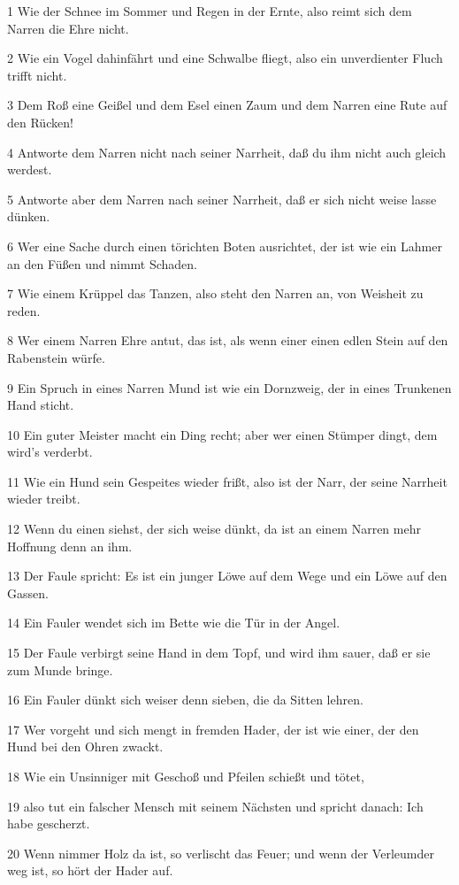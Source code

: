 \par 1 Wie der Schnee im Sommer und Regen in der Ernte, also reimt sich dem Narren die Ehre nicht.
\par 2 Wie ein Vogel dahinfährt und eine Schwalbe fliegt, also ein unverdienter Fluch trifft nicht.
\par 3 Dem Roß eine Geißel und dem Esel einen Zaum und dem Narren eine Rute auf den Rücken!
\par 4 Antworte dem Narren nicht nach seiner Narrheit, daß du ihm nicht auch gleich werdest.
\par 5 Antworte aber dem Narren nach seiner Narrheit, daß er sich nicht weise lasse dünken.
\par 6 Wer eine Sache durch einen törichten Boten ausrichtet, der ist wie ein Lahmer an den Füßen und nimmt Schaden.
\par 7 Wie einem Krüppel das Tanzen, also steht den Narren an, von Weisheit zu reden.
\par 8 Wer einem Narren Ehre antut, das ist, als wenn einer einen edlen Stein auf den Rabenstein würfe.
\par 9 Ein Spruch in eines Narren Mund ist wie ein Dornzweig, der in eines Trunkenen Hand sticht.
\par 10 Ein guter Meister macht ein Ding recht; aber wer einen Stümper dingt, dem wird's verderbt.
\par 11 Wie ein Hund sein Gespeites wieder frißt, also ist der Narr, der seine Narrheit wieder treibt.
\par 12 Wenn du einen siehst, der sich weise dünkt, da ist an einem Narren mehr Hoffnung denn an ihm.
\par 13 Der Faule spricht: Es ist ein junger Löwe auf dem Wege und ein Löwe auf den Gassen.
\par 14 Ein Fauler wendet sich im Bette wie die Tür in der Angel.
\par 15 Der Faule verbirgt seine Hand in dem Topf, und wird ihm sauer, daß er sie zum Munde bringe.
\par 16 Ein Fauler dünkt sich weiser denn sieben, die da Sitten lehren.
\par 17 Wer vorgeht und sich mengt in fremden Hader, der ist wie einer, der den Hund bei den Ohren zwackt.
\par 18 Wie ein Unsinniger mit Geschoß und Pfeilen schießt und tötet,
\par 19 also tut ein falscher Mensch mit seinem Nächsten und spricht danach: Ich habe gescherzt.
\par 20 Wenn nimmer Holz da ist, so verlischt das Feuer; und wenn der Verleumder weg ist, so hört der Hader auf.
